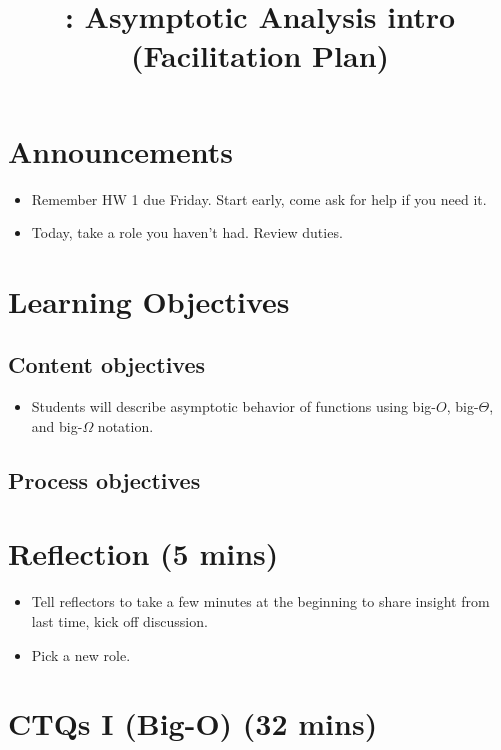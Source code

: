 \documentclass{tufte-handout}
\title{\thecourse: Asymptotic Analysis intro (Facilitation Plan)}
\date{}
\begin{document}
\maketitle

\section{Announcements}

\begin{itemize}
\item Remember HW 1 due Friday.  Start early, come ask for help if you
  need it.
\item Today, take a role you haven't had.  Review duties.
\end{itemize}

\section{Learning Objectives}

\subsection{Content objectives}

\begin{itemize}
\item Students will describe asymptotic behavior of functions using
  big-$O$, big-$\Theta$, and big-$\Omega$ notation.
\end{itemize}

\subsection{Process objectives}

\section{Reflection (5 mins)}

\begin{itemize}
\item Tell reflectors to take a few minutes at the beginning to share
  insight from last time, kick off discussion.
\item Pick a new role.
\end{itemize}

\section{CTQs I (Big-O) (32 mins)}
\end{document}
